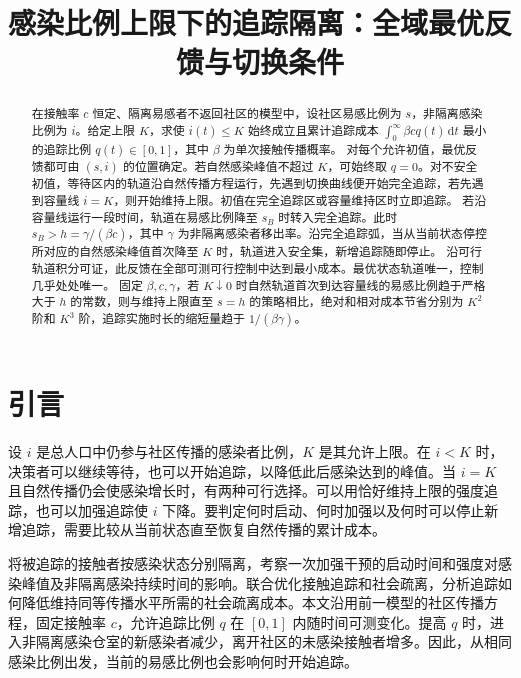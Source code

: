 \documentclass[lang=cn,a4paper,newtx]{elegantpaper}
\title{感染比例上限下的追踪隔离：全域最优反馈与切换条件}
\author{}
\date{}
\theoremstyle{plain}
\theoremstyle{definition}
\newcommand{\dd}{\,\mathrm d}
\begin{document}
\maketitle

\begin{abstract}
在接触率 $c$ 恒定、隔离易感者不返回社区的模型中，设社区易感比例为 $s$，非隔离感染比例为 $i$。给定上限 $K$，求使 $i(t)\le K$ 始终成立且累计追踪成本 $\int_0^\infty\beta cq(t)\dd t$ 最小的追踪比例 $q(t)\in[0,1]$，其中 $\beta$ 为单次接触传播概率。
对每个允许初值，最优反馈都可由 $(s,i)$ 的位置确定。若自然感染峰值不超过 $K$，可始终取 $q=0$。对不安全初值，等待区内的轨道沿自然传播方程运行，先遇到切换曲线便开始完全追踪，若先遇到容量线 $i=K$，则开始维持上限。初值在完全追踪区或容量维持区时立即追踪。
若沿容量线运行一段时间，轨道在易感比例降至 $s_B$ 时转入完全追踪。此时 $s_B>h=\gamma/(\beta c)$，其中 $\gamma$ 为非隔离感染者移出率。沿完全追踪弧，当从当前状态停控所对应的自然感染峰值首次降至 $K$ 时，轨道进入安全集，新增追踪随即停止。
沿可行轨道积分可证，此反馈在全部可测可行控制中达到最小成本。最优状态轨道唯一，控制几乎处处唯一。
固定 $\beta,c,\gamma$，若 $K\downarrow0$ 时自然轨道首次到达容量线的易感比例趋于严格大于 $h$ 的常数，则与维持上限直至 $s=h$ 的策略相比，绝对和相对成本节省分别为 $K^2$ 阶和 $K^3$ 阶，追踪实施时长的缩短量趋于 $1/(\beta\gamma)$。
\end{abstract}

\section{引言}
\label{sec:introduction}

设 $i$ 是总人口中仍参与社区传播的感染者比例，$K$ 是其允许上限。在 $i<K$ 时，决策者可以继续等待，也可以开始追踪，以降低此后感染达到的峰值。当 $i=K$ 且自然传播仍会使感染增长时，有两种可行选择。可以用恰好维持上限的强度追踪，也可以加强追踪使 $i$ 下降。要判定何时启动、何时加强以及何时可以停止新增追踪，需要比较从当前状态直至恢复自然传播的累计成本。

\textcite[式(2.1)--(2.2)、(3.1)]{Zhou2024SPCI}将被追踪的接触者按感染状态分别隔离，考察一次加强干预的启动时间和强度对感染峰值及非隔离感染持续时间的影响。\textcite{Pollinger2023}联合优化接触追踪和社会疏离，分析追踪如何降低维持同等传播水平所需的社会疏离成本。本文沿用前一模型的社区传播方程，固定接触率 $c$，允许追踪比例 $q$ 在 $[0,1]$ 内随时间可测变化。提高 $q$ 时，进入非隔离感染仓室的新感染者减少，离开社区的未感染接触者增多。因此，从相同感染比例出发，当前的易感比例也会影响何时开始追踪。
\end{document}
